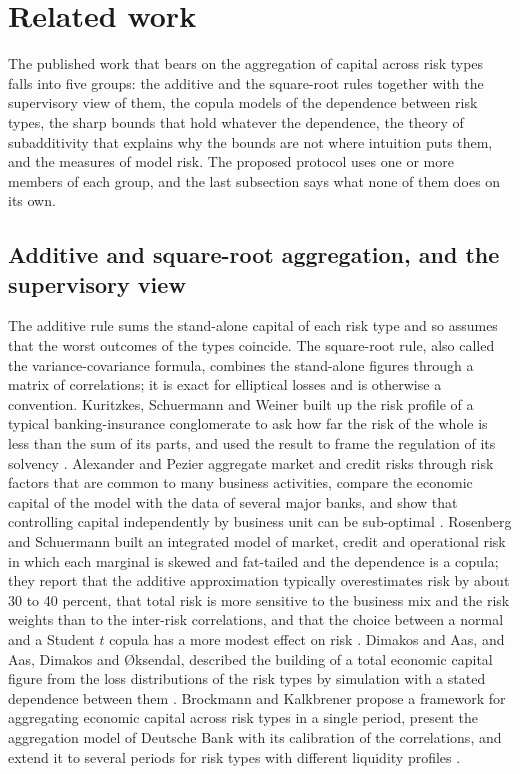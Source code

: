 \section{Related work}
\label{sec:related-work}

The published work that bears on the aggregation of capital across risk types falls into five groups: the additive and the
square-root rules together with the supervisory view of them, the copula models of the dependence between risk types, the sharp
bounds that hold whatever the dependence, the theory of subadditivity that explains why the bounds are not where intuition puts
them, and the measures of model risk. The proposed protocol uses one or more members of each group, and the last subsection says
what none of them does on its own.

\subsection{Additive and square-root aggregation, and the supervisory view}
\label{sec:rw-additive}

The additive rule sums the stand-alone capital of each risk type and so assumes that the worst outcomes of the types coincide.
The square-root rule, also called the variance-covariance formula, combines the stand-alone figures through a matrix of
correlations; it is exact for elliptical losses and is otherwise a convention. Kuritzkes, Schuermann and Weiner built up the risk profile of a typical
banking-insurance conglomerate to ask how far the risk of the whole is less than the sum of its parts, and used the result to frame
the regulation of its solvency \citep{kuritzkes2003}. Alexander and Pezier aggregate market and credit risks through risk factors
that are common to many business activities, compare the economic capital of the model with the data of several major banks, and
show that controlling capital independently by business unit can be sub-optimal \citep{alexander2004}. Rosenberg and Schuermann built an integrated model of market, credit and operational risk in
which each marginal is skewed and fat-tailed and the dependence is a copula; they report that the additive approximation
typically overestimates risk by about 30 to 40 percent, that total risk is more sensitive to the business mix and the risk weights
than to the inter-risk correlations, and that the choice between a normal and a Student $t$ copula has a more modest effect on risk
\citep{rosenberg2006}. Dimakos and Aas, and Aas, Dimakos and \O ksendal, described the building of a total
economic capital figure from the loss distributions of the risk types by simulation with a stated dependence between them
\citep{dimakos2004,aas2007}. Brockmann and Kalkbrener propose a framework for aggregating economic capital across risk types in a single period, present the
aggregation model of Deutsche Bank with its calibration of the correlations, and extend it to several periods for risk types with
different liquidity profiles \citep{brockmann2010}.

